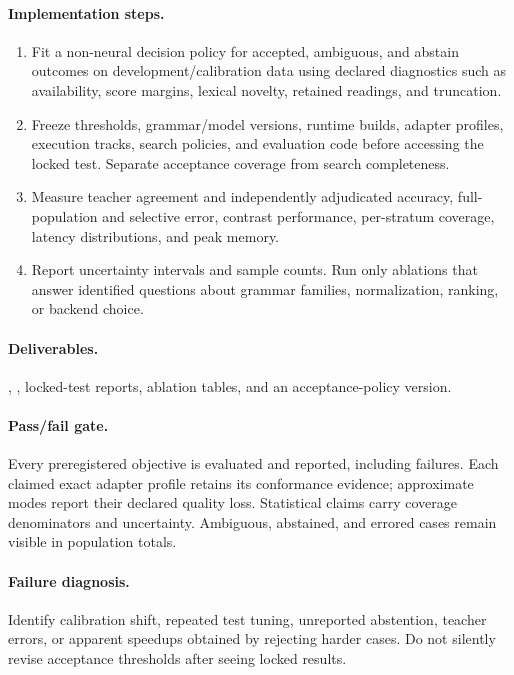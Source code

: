 \documentclass[11pt,a4paper]{article}
\begin{document}
\paragraph{Implementation steps.}
\begin{enumerate}
\item Fit a non-neural decision policy for accepted, ambiguous, and abstain outcomes on development/calibration data using declared diagnostics such as availability, score margins, lexical novelty, retained readings, and truncation.
\item Freeze thresholds, grammar/model versions, runtime builds, adapter profiles, execution tracks, search policies, and evaluation code before accessing the locked test. Separate acceptance coverage from search completeness.
\item Measure teacher agreement and independently adjudicated accuracy, full-population and selective error, contrast performance, per-stratum coverage, latency distributions, and peak memory.
\item Report uncertainty intervals and sample counts. Run only ablations that answer identified questions about grammar families, normalization, ranking, or backend choice.
\end{enumerate}

\paragraph{Deliverables.} , , locked-test reports, ablation tables, and an acceptance-policy version.

\paragraph{Pass/fail gate.} Every preregistered objective is evaluated and reported, including failures. Each claimed exact adapter profile retains its conformance evidence; approximate modes report their declared quality loss. Statistical claims carry coverage denominators and uncertainty. Ambiguous, abstained, and errored cases remain visible in population totals.

\paragraph{Failure diagnosis.} Identify calibration shift, repeated test tuning, unreported abstention, teacher errors, or apparent speedups obtained by rejecting harder cases. Do not silently revise acceptance thresholds after seeing locked results.
\end{document}
